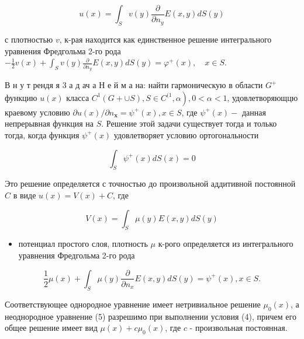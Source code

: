 \documentclass[10pt]{article}
\begin{document}
\[

u(x)=\int_{S} v(y) \frac{\partial}{\partial n_{y}} E(x, y) d S(y)

\]



с плотностью $v$, к-рая находится как единственное решение интегрального уравнения Фредгольма 2-го рода $-\frac{1}{2} v(x)+\int_{S} v(y) \frac{\partial}{\partial n_{y}} E(x, y) d S(y)=\varphi^{+}(x), \quad x \in S$.



В н у т рендя я 3 а д ач а Н е й м а на: найти гармоническую в области $G^{+}$функцию $u(x)$ класса $\left.C^{1}(G+\cup S), S \in C^{(1}, \alpha\right), 0<\alpha<1$, удовлетворяющцю краевому условию $\partial u(x) / \partial n_{\boldsymbol{x}}=\psi^{+}(x), x \in S$, где $\psi^{+}(x)-$ данная непрерывная функция на $S$. Решение этой задачи существует тогда и только тогда, когда функция $\psi^{+}(x)$ удовлетворяет условию ортогональности



\[

\int_{S} \psi^{+}(x) d S(x)=0

\]



Это решение определяется с точностью до произвольной аддитивной постоянной $C$ в виде $u(x)=V(x)+C$, где



\[

V(x)=\int_{S} \mu(y) E(x, y) d S(y)

\]



\begin{itemize}

  \item потенциал простого слоя, плотность $\mu$ к-рого определяется из интегрального уравнения Фредгольма 2-го рода

\end{itemize}



\[

\frac{1}{2} \mu(x)+\int_{S} \mu(y) \frac{\partial}{\partial n_{x}} E(x, y) d S(y)=\psi^{+}(x), x \in S .

\]



Соответствующее однородное уравнение имеет нетривиальное решение $\mu_{0}(x)$, а неоднородное уравнение (5) разрешимо при выполнении условия (4), причем его общее решение имеет вид $\mu(x)+c \mu_{0}(x)$, где $c$ - произвольная постоянная.
\end{document}
